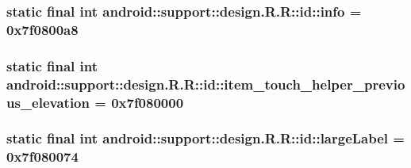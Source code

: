 \hypertarget{classandroid_1_1support_1_1design_1_1_r_1_1id_c329a5b4324a3c0744f656038e93fbf9}{
\subsubsection[{info}]{\setlength{\rightskip}{0pt plus 5cm}static final int android::support::design.R.R::id::info = 0x7f0800a8}}
\label{classandroid_1_1support_1_1design_1_1_r_1_1id_c329a5b4324a3c0744f656038e93fbf9}


\hypertarget{classandroid_1_1support_1_1design_1_1_r_1_1id_cdc1d74d71e50ecc694f9672d65f3014}{
\subsubsection[{item\_\-touch\_\-helper\_\-previous\_\-elevation}]{\setlength{\rightskip}{0pt plus 5cm}static final int android::support::design.R.R::id::item\_\-touch\_\-helper\_\-previous\_\-elevation = 0x7f080000}}
\label{classandroid_1_1support_1_1design_1_1_r_1_1id_cdc1d74d71e50ecc694f9672d65f3014}


\hypertarget{classandroid_1_1support_1_1design_1_1_r_1_1id_311490e753c2dc69e8db13798837bb9d}{
\subsubsection[{largeLabel}]{\setlength{\rightskip}{0pt plus 5cm}static final int android::support::design.R.R::id::largeLabel = 0x7f080074}}
\label{classandroid_1_1support_1_1design_1_1_r_1_1id_311490e753c2dc69e8db13798837bb9d}


